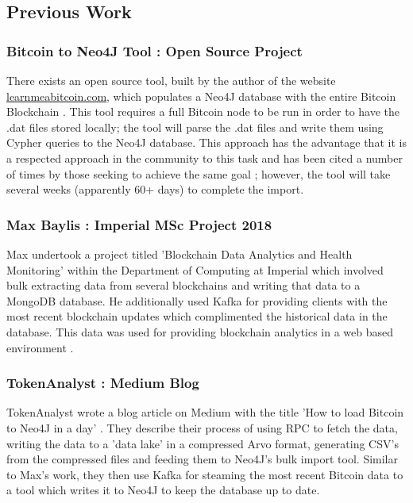 \subsection{Previous Work}\label{design-db-previous-work}
\subsubsection{Bitcoin to Neo4J Tool : Open Source Project}
There exists an open source tool, built by the author of the website \url{learnmeabitcoin.com}, which populates a Neo4J database with the entire Bitcoin Blockchain \cite{RefWorks:doc:5c98e031e4b068320632cef2}. This tool requires a full Bitcoin node to be run in order to have the .dat files stored locally; the tool will parse the .dat files and write them using Cypher queries to the Neo4J database. This approach has the advantage that it is a respected approach in the community to this task and has been cited a number of times by those seeking to achieve the same goal \cite{RefWorks:doc:5c98e0cde4b044512c0b8641}; however, the tool will take several weeks (apparently 60+ days) to complete the import. 

\subsubsection{Max Baylis : Imperial MSc Project 2018}
Max undertook a project titled 'Blockchain Data Analytics and Health Monitoring' within the Department of Computing at Imperial \cite{RefWorks:doc:5c6bd151e4b041254f892045} which involved bulk extracting data from several blockchains and writing that data to a MongoDB database. He additionally used Kafka for providing clients with the most recent blockchain updates which complimented the historical data in the database. This data was used for providing blockchain analytics in a web based environment \cite{RefWorks:doc:5c6bd151e4b041254f892045}. 

\subsubsection{TokenAnalyst : Medium Blog}
TokenAnalyst wrote a blog article on Medium with the title 'How to load Bitcoin to Neo4J in a day' \cite{RefWorks:doc:5c98e0cde4b044512c0b8641}. They describe their process of using RPC to fetch the data, writing the data to a 'data lake' in a compressed Arvo format, generating CSV's from the compressed files and feeding them to Neo4J's bulk import tool. Similar to Max's work, they then use Kafka for steaming the most recent Bitcoin data to a tool which writes it to Neo4J to keep the database up to date. 

